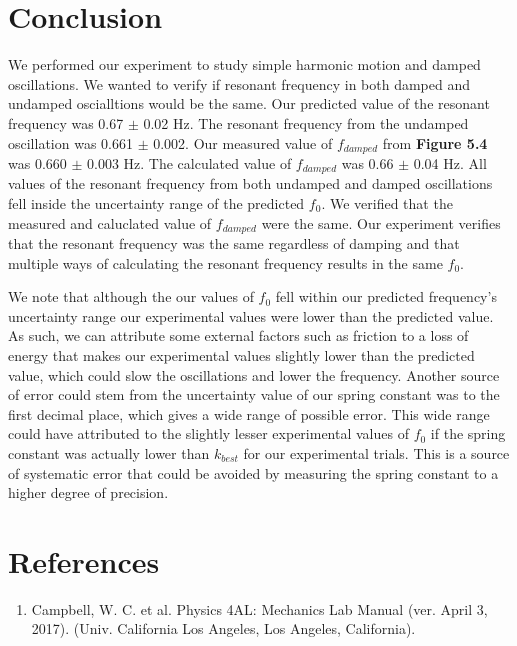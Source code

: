 \documentclass[11pt]{report}
\begin{document}
\section*{Conclusion}
We performed our experiment to study simple harmonic motion and damped
oscillations.  We wanted to verify if resonant frequency in both damped and
undamped oscialltions would be the same.  
Our predicted value of the resonant frequency was 0.67 $\pm$ 0.02 Hz.  
The resonant frequency from the undamped oscillation was 0.661 $\pm$ 0.002.  Our
measured value of \(f_{damped}\) from \textbf{Figure 5.4} was 0.660 $\pm$ 0.003
Hz.  The calculated value of \(f_{damped}\) was 0.66 $\pm$ 0.04 Hz.  All values of
the resonant frequency from both undamped and damped oscillations fell inside
the uncertainty range of the predicted \(f_0\).  We verified that the measured
and caluclated value of \(f_{damped}\) were the same.  Our experiment verifies
that the resonant frequency was the same regardless of damping and that multiple
ways of calculating the resonant frequency results in the same \(f_0\).

We note that although the our values of \(f_0\) fell within our predicted
frequency's uncertainty range our experimental values were lower than the
predicted value.  As such, we can attribute some external factors such as
friction to a loss of energy that makes our experimental values slightly lower
than the predicted value, which could slow the oscillations and lower the
frequency.  Another source of error could stem from the uncertainty value
of our spring constant was to the first decimal place, which gives a wide range
of possible error.  This wide range could have attributed to the slightly lesser
experimental values of \(f_0\) if the spring constant was actually lower than
\(k_{best}\) for our experimental trials.  This is a source of systematic error
that could be avoided by measuring the spring constant to a higher degree of
precision.


\newpage
\section*{References}
\begin{enumerate}
    \item Campbell, W. C. et al. Physics 4AL: Mechanics Lab Manual (ver. April
        3, 2017). (Univ. California Los Angeles, Los Angeles, California).
\end{enumerate}
\end{document}
